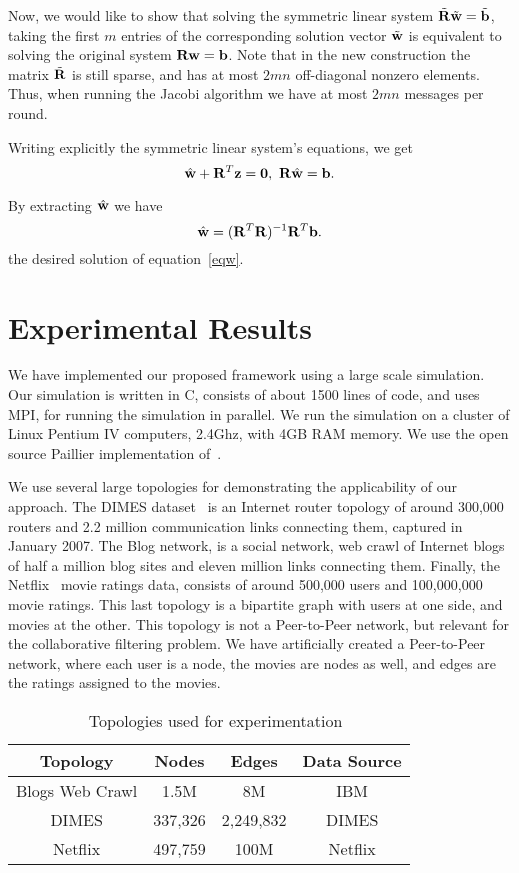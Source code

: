 \documentclass[times, 10pt,twocolumn]{article}
\begin{document}
Now, we would like to show that solving the symmetric linear
system $\tilde{{\bf R}}\tilde{{\bf w}}=\tilde{{\bf b}}$, taking the first $m$
entries of the corresponding solution vector $\tilde{{\bf w}}$ is
equivalent to solving the original system ${\bf R}{\bf w}={\bf b}$. Note that
in the new construction the matrix $\tilde{{\bf R}}$ is still sparse,
and has at most $2mn$ off-diagonal nonzero elements. Thus, when
running the Jacobi algorithm we have at most $2mn$ messages per
round.

Writing explicitly the symmetric linear system's equations, we get
\[ \hat{{\bf w}}+{\bf R}^T{\bf z}=\mathbf{0},\mbox{  }\\
    {\bf R}\hat{{\bf w}}={\bf b}.
    \]

By extracting $\hat{{\bf w}}$ we have \[
\hat{{\bf w}}=({\bf R}^{T}{\bf R})^{-1}{\bf R}^{T}{\bf b}. \] the desired solution of
equation~\ref{eqw}.

\section{Experimental Results}
\label{exp} We have implemented our proposed framework using a
large scale simulation. Our simulation is written in C, consists
of about 1500 lines of code, and uses MPI, for running the
simulation in parallel. We run the simulation on a cluster of
Linux Pentium IV computers, 2.4Ghz, with 4GB RAM memory. We use
the open source Paillier implementation of~\cite{PaillierIMP}.

We use several large topologies for demonstrating the
applicability of our approach. The DIMES dataset~\cite{DIMES} is
an Internet router topology of around 300,000 routers and 2.2
million communication links connecting them, captured in January
2007. The Blog network, is a social network, web crawl of Internet
blogs of half a million blog sites and eleven million links
connecting them. Finally, the Netflix~\cite{Netflix} movie ratings
data, consists of around 500,000 users and 100,000,000 movie
ratings. This last topology is a bipartite graph with users at one
side, and movies at the other. This topology is not a Peer-to-Peer
network, but relevant for the collaborative filtering problem. We
have artificially created a Peer-to-Peer network, where each user
is a node, the movies are nodes as well, and edges are the ratings
assigned to the movies.

\begin{table}[h!]
\begin{center}
\begin{tabular}{|c|c|c|c|}
  \hline
Topology & Nodes & Edges & Data Source \\
  \hline
  Blogs Web Crawl & 1.5M & 8M & IBM \\
  DIMES & 337,326  & 2,249,832 & DIMES  \\
  Netflix & 497,759 & 100M & Netflix \\
  \hline
\end{tabular}
\caption{\mbox{              } Topologies used for
experimentation}
\end{center}
\end{table}
\vspace{-5mm}
\end{document}
